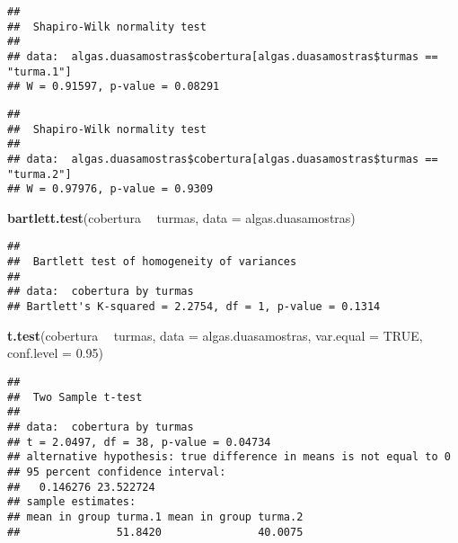 \documentclass[14pt,titlepage, oneside, openany, a4paper]{book}
\newenvironment{Shaded}{\begin{snugshade}}{\end{snugshade}}
\newcommand{\DataTypeTok}[1]{\textcolor[rgb]{0.13,0.29,0.53}{#1}}
\newcommand{\FloatTok}[1]{\textcolor[rgb]{0.00,0.00,0.81}{#1}}
\newcommand{\KeywordTok}[1]{\textcolor[rgb]{0.13,0.29,0.53}{\textbf{#1}}}
\newcommand{\NormalTok}[1]{#1}
\newcommand{\OperatorTok}[1]{\textcolor[rgb]{0.81,0.36,0.00}{\textbf{#1}}}
\newcommand{\OtherTok}[1]{\textcolor[rgb]{0.56,0.35,0.01}{#1}}
\newcommand{\StringTok}[1]{\textcolor[rgb]{0.31,0.60,0.02}{#1}}
\begin{document}
\begin{verbatim}
## 
##  Shapiro-Wilk normality test
## 
## data:  algas.duasamostras$cobertura[algas.duasamostras$turmas == "turma.1"]
## W = 0.91597, p-value = 0.08291
\end{verbatim}

\begin{Shaded}
\end{Shaded}

\begin{verbatim}
## 
##  Shapiro-Wilk normality test
## 
## data:  algas.duasamostras$cobertura[algas.duasamostras$turmas == "turma.2"]
## W = 0.97976, p-value = 0.9309
\end{verbatim}

\begin{Shaded}
\begin{Highlighting}[]
\KeywordTok{bartlett.test}\NormalTok{(cobertura }\OperatorTok{~}\StringTok{ }\NormalTok{turmas, }\DataTypeTok{data =}\NormalTok{ algas.duasamostras)}
\end{Highlighting}
\end{Shaded}

\begin{verbatim}
## 
##  Bartlett test of homogeneity of variances
## 
## data:  cobertura by turmas
## Bartlett's K-squared = 2.2754, df = 1, p-value = 0.1314
\end{verbatim}

\begin{Shaded}
\begin{Highlighting}[]
\KeywordTok{t.test}\NormalTok{(cobertura }\OperatorTok{~}\StringTok{ }\NormalTok{turmas, }
       \DataTypeTok{data =}\NormalTok{ algas.duasamostras,}
       \DataTypeTok{var.equal =} \OtherTok{TRUE}\NormalTok{,}
       \DataTypeTok{conf.level =} \FloatTok{0.95}\NormalTok{)}
\end{Highlighting}
\end{Shaded}

\begin{verbatim}
## 
##  Two Sample t-test
## 
## data:  cobertura by turmas
## t = 2.0497, df = 38, p-value = 0.04734
## alternative hypothesis: true difference in means is not equal to 0
## 95 percent confidence interval:
##   0.146276 23.522724
## sample estimates:
## mean in group turma.1 mean in group turma.2 
##               51.8420               40.0075
\end{verbatim}
\end{document}
